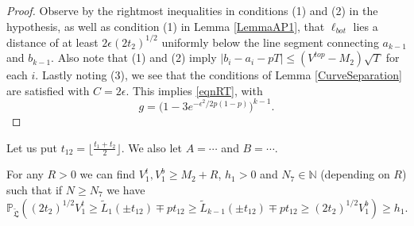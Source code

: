 	\begin{proof}
		
		Observe by the rightmost inequalities in conditions (1) and (2) in the hypothesis, as well as condition (1) in Lemma \ref{LemmaAP1}, that $\ell_{bot}$ lies a distance of at least $2\epsilon(2t_2)^{1/2}$ uniformly below the line segment connecting $a_{k-1}$ and $b_{k-1}$. Also note that (1) and (2) imply $|b_i-a_i-pT| \leq (V^{top} - M_2)\sqrt{T}$ for each $i$. Lastly noting (3), we see that the conditions of Lemma \ref{CurveSeparation} are satisfied with $C = 2\epsilon$. This implies \eqref{eqnRT}, with
		\[
		g = \big(1 - 3e^{-\epsilon^2/2p(1-p)}\big)^{k-1}.
		\]
		
	\end{proof}

Let us put $t_{12} = \lfloor \frac{t_1 + t_2}{2} \rfloor$. We also let $A = \cdots$ and $B = \cdots $. 

\begin{lemma}\label{LemmaBP2} For any $R > 0$ we can find $V_1^t, V_1^b \geq M_2 + R$, $h_1 > 0$ and $N_7 \in \mathbb{N}$ (depending on $R$) such that if $N \geq N_7$ we have
		\begin{equation}\label{eqnRT2}
		\mathbb{P}_{\tilde{\mathfrak{L}}} \left(  (2t_2)^{1/2} V_1^t \geq \tilde{L}_1(\pm t_{12}) \mp p t_{12} \geq \tilde{L}_{k-1}(\pm t_{12}) \mp p t_{12} \geq (2t_2)^{1/2} V_1^b  \right) \geq h_1.
		\end{equation}
	
\end{lemma}


